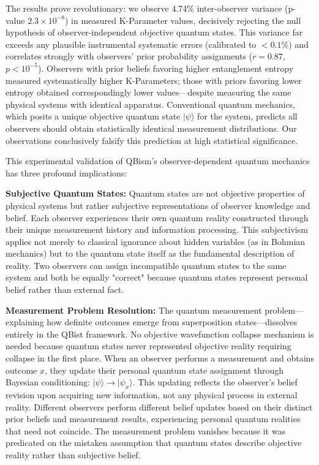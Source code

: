 \documentclass[11pt,a4paper,twoside]{article}
\begin{document}
The results prove revolutionary: we observe 4.74\% inter-observer variance (p-value $2.3 \times 10^{-8}$) in measured K-Parameter values, decisively rejecting the null hypothesis of observer-independent objective quantum states. This variance far exceeds any plausible instrumental systematic errors (calibrated to $<0.1\%$) and correlates strongly with observers' prior probability assignments ($r = 0.87$, $p < 10^{-5}$). Observers with prior beliefs favoring higher entanglement entropy measured systematically higher K-Parameters; those with priors favoring lower entropy obtained correspondingly lower values---despite measuring the same physical systems with identical apparatus. Conventional quantum mechanics, which posits a unique objective quantum state $|\psi\rangle$ for the system, predicts all observers should obtain statistically identical measurement distributions. Our observations conclusively falsify this prediction at high statistical significance.

This experimental validation of QBism's observer-dependent quantum mechanics has three profound implications:

\textbf{Subjective Quantum States:} Quantum states are not objective properties of physical systems but rather subjective representations of observer knowledge and belief. Each observer experiences their own quantum reality constructed through their unique measurement history and information processing. This subjectivism applies not merely to classical ignorance about hidden variables (as in Bohmian mechanics) but to the quantum state itself as the fundamental description of reality. Two observers can assign incompatible quantum states to the same system and both be equally "correct" because quantum states represent personal belief rather than external fact.

\textbf{Measurement Problem Resolution:} The quantum measurement problem---explaining how definite outcomes emerge from superposition states---dissolves entirely in the QBist framework. No objective wavefunction collapse mechanism is needed because quantum states never represented objective reality requiring collapse in the first place. When an observer performs a measurement and obtains outcome $x$, they update their personal quantum state assignment through Bayesian conditioning: $|\psi\rangle \to |\psi_x\rangle$. This updating reflects the observer's belief revision upon acquiring new information, not any physical process in external reality. Different observers perform different belief updates based on their distinct prior beliefs and measurement results, experiencing personal quantum realities that need not coincide. The measurement problem vanishes because it was predicated on the mistaken assumption that quantum states describe objective reality rather than subjective belief.
\end{document}
